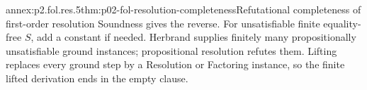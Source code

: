 \begin{annexitem}{annex:p2.fol.res.5}{thm:p02-fol-resolution-completeness}{Refutational completeness of first-order resolution}
Soundness gives the reverse.  For unsatisfiable finite equality-free \(S\),
add a constant if needed.  Herbrand supplies finitely many propositionally
unsatisfiable ground instances; propositional resolution refutes them.
Lifting replaces every ground step by a Resolution or Factoring instance, so
the finite lifted derivation ends in the empty clause.
\end{annexitem}
